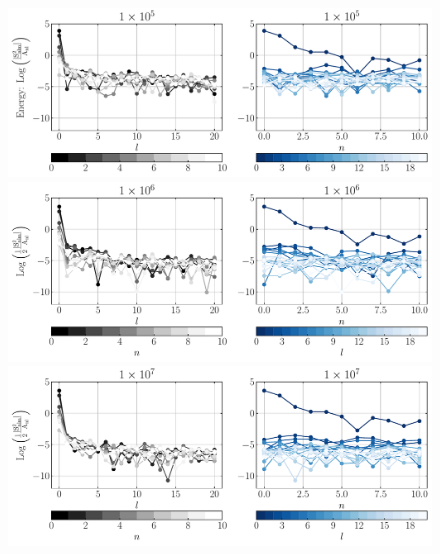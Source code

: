 \documentclass[14pt]{article}
\begin{document}
\begin{figure}[h]
  \centering
  \includegraphics[scale=0.5]{../code/energy_terms_hern_a_40_1E5.pdf}
  \includegraphics[scale=0.5]{../code/energy_terms_hern_a_40_1E6.pdf}
  \includegraphics[scale=0.5]{../code/energy_terms_hern_a_40_1E7.pdf}
\end{figure}
\end{document}
